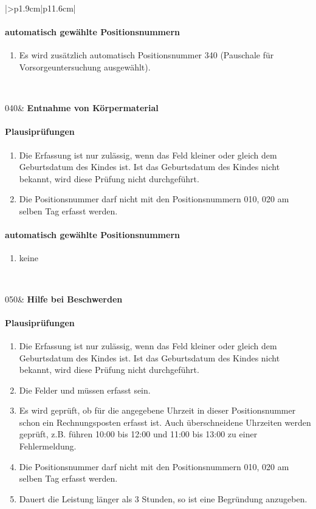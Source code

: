 \begin{mpsupertabular}{|>{\centering}p{1.9cm}|p{11.6cm}|}
\paragraph{automatisch gewählte Positionsnummern}
\begin{enumerate}
\item
Es wird zusätzlich automatisch Positionsnummer 340 (Pauschale für
Vorsorgeuntersuchung ausgewählt).
\end{enumerate}
\\ \hline

040&
\textbf{Entnahme von Körpermaterial}
\paragraph{Plausiprüfungen}
\begin{enumerate}
\item
Die Erfassung ist nur zulässig, wenn das Feld  kleiner 
oder gleich dem Geburtsdatum des Kindes ist. Ist das Geburtsdatum des
Kindes nicht bekannt, wird diese Prüfung nicht durchgeführt.
\item
Die Positionsnummer darf nicht mit den Positionsnummern 010, 020 am
selben Tag erfasst werden.
\end{enumerate}
\paragraph{automatisch gewählte Positionsnummern}
\begin{enumerate}
\item
keine
\end{enumerate}
\\ \hline


050&
\textbf{Hilfe bei Beschwerden}
\paragraph{Plausiprüfungen}
\begin{enumerate}
\item
Die Erfassung ist nur zulässig, wenn das Feld  kleiner 
oder gleich dem Geburtsdatum des Kindes ist. Ist das Geburtsdatum des
Kindes nicht bekannt, wird diese Prüfung nicht durchgeführt.
\item
Die Felder  und  müssen erfasst sein.
\item
Es wird geprüft, ob für die angegebene Uhrzeit in dieser Positionsnummer
schon ein Rechnungsposten erfasst ist. Auch überschneidene Uhrzeiten
werden geprüft, z.B. führen 10:00 bis 12:00 und 11:00 bis 13:00 zu einer
Fehlermeldung.
\item
Die Positionsnummer darf nicht mit den Positionsnummern 010, 020 am
selben Tag erfasst werden.
\item
Dauert die Leistung länger als 3 Stunden, so ist eine Begründung anzugeben.
\end{enumerate}

\end{mpsupertabular}
